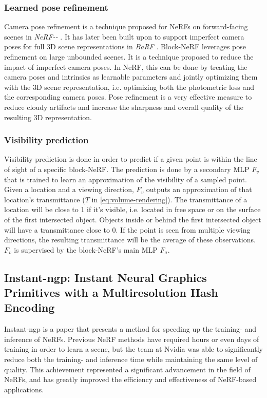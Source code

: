 \subsubsection{Learned pose refinement} \label{sec:camera-pose-refinement}
Camera pose refinement is a technique proposed for NeRFs on forward-facing scenes in \textit{NeRF\nobreakdash-\nobreakdash-} \cite{wang_nerf--_2022}. It has later been built upon to support imperfect camera poses for full 3D scene representations in \textit{BaRF} \cite{lin_barf_2021}. Block-NeRF leverages pose refinement on large unbounded scenes. It is a technique proposed to reduce the impact of imperfect camera poses. In NeRF, this can be done by treating the camera poses and intrinsics as learnable parameters and jointly optimizing them with the 3D scene representation, i.e. optimizing both the photometric loss and the corresponding camera poses. Pose refinement is a very effective measure to reduce cloudy artifacts and increase the sharpness and overall quality of the resulting 3D representation.

\subsubsection{Visibility prediction} \label{sec:visibility-prediction}
Visibility prediction is done in order to predict if a given point is within the line of sight of a specific block-NeRF. The prediction is done by a secondary MLP $F_v$ that is trained to learn an approximation of the visibility of a sampled point. Given a location and a viewing direction, $F_v$ outputs an approximation of that location's transmittance ($T$ in \autoref{eq:volume-rendering}). The transmittance of a location will be close to 1 if it's visible, i.e. located in free space or on the surface of the first intersected object. Objects inside or behind the first intersected object will have a transmittance close to 0. If the point is seen from multiple viewing directions, the resulting transmittance will be the average of these observations. $F_v$ is supervised by the block-NeRF's main MLP $F_\sigma$.



\subsection{Instant-ngp: Instant Neural Graphics Primitives with a Multiresolution Hash Encoding} \label{sec:instant-ngp}
Instant-ngp \cite{muller_instant_2022} is a paper that presents a method for speeding up the training- and inference of NeRFs. Previous NeRF methods have required hours or even days of training in order to learn a scene, but the team at Nvidia was able to significantly reduce both the training- and inference time while maintaining the same level of quality. This achievement represented a significant advancement in the field of NeRFs, and has greatly improved the efficiency and effectiveness of NeRF-based applications.

